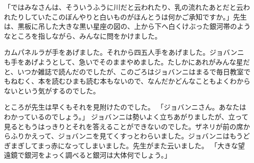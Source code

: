 \documentclass[tate,book,paper=a5,fontsize=10pt,jafontsize=10pt,oneside]{jlreq}
\begin{document}
「ではみなさんは、そういうふうに川だと云われたり、乳の流れたあとだと云われたりしていたこのぼんやりと白いものがほんとうは何かご承知ですか。」先生は、黒板に吊した大きな黒い星座の図の、上から下へ白くけぶった銀河帯のようなところを指しながら、みんなに問をかけました。

カムパネルラが手をあげました。それから四五人手をあげました。ジョバンニも手をあげようとして、急いでそのままやめました。たしかにあれがみんな星だと、いつか雑誌で読んだのでしたが、このごろはジョバンニはまるで毎日教室でもねむく、本を読むひまも読む本もないので、なんだかどんなこともよくわからないという気がするのでした。

\newpage

ところが先生は早くもそれを見附けたのでした。
「ジョバンニさん。あなたはわかっているのでしょう。」
ジョバンニは勢いよく立ちあがりましたが、立って見るともうはっきりとそれを答えることができないのでした。ザネリが前の席からふりかえって、ジョバンニを見てくすっとわらいました。ジョバンニはもうどぎまぎしてまっ赤になってしまいました。先生がまた云いました。
「大きな望遠鏡で銀河をよっく調べると銀河は大体何でしょう。」
\end{document}
